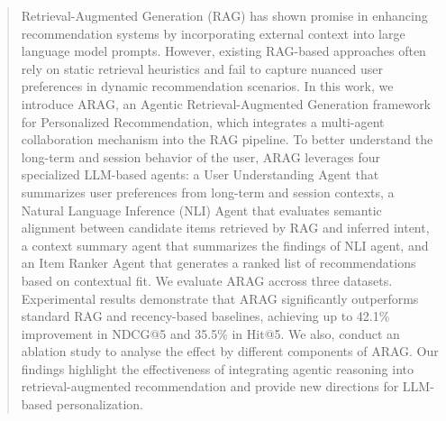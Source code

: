 \documentclass[sigconf]{acmart}
\begin{document}
\author{Sushant Kumar}



\renewcommand{\shortauthors}{Maragheh et al.}

\begin{abstract}
Retrieval-Augmented Generation (RAG) has shown promise in enhancing recommendation systems by incorporating external context into large language model prompts. However, existing RAG-based approaches often rely on static retrieval heuristics and fail to capture nuanced user preferences in dynamic recommendation scenarios. In this work, we introduce ARAG, an Agentic Retrieval-Augmented Generation framework for Personalized Recommendation, which integrates a multi-agent collaboration mechanism into the RAG pipeline. To better understand the long-term and session behavior of the user, ARAG leverages four specialized LLM-based agents: a User Understanding Agent that summarizes user preferences from long-term and session contexts, a Natural Language Inference (NLI) Agent that evaluates semantic alignment between candidate items retrieved by RAG and inferred intent, a context summary agent that summarizes the findings of NLI agent, and an Item Ranker Agent that generates a ranked list of recommendations based on contextual fit. We evaluate ARAG accross three datasets. Experimental results demonstrate that ARAG significantly outperforms standard RAG and recency-based baselines, achieving up to 42.1\% improvement in NDCG@5 and 35.5\% in Hit@5. We also, conduct an ablation study to analyse the effect by different components of ARAG. Our findings highlight the effectiveness of integrating agentic reasoning into retrieval-augmented recommendation and provide new directions for LLM-based personalization.
\end{abstract}

\end{document}
